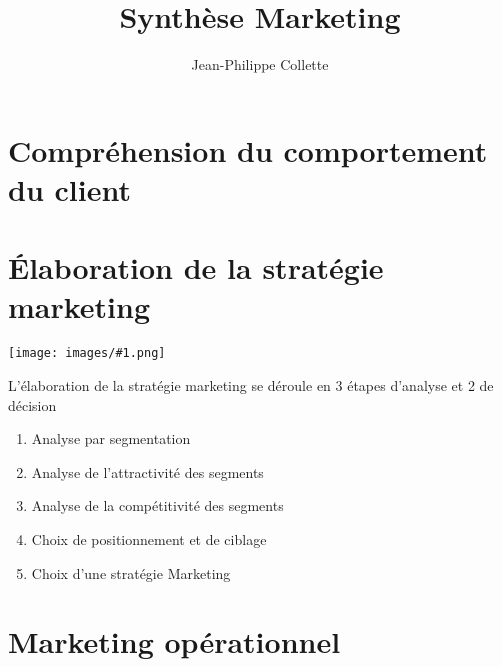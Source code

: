 \documentclass[10pt,a4paper]{report}
\author{Jean-Philippe Collette}
\title{Synthèse Marketing}
\newcommand{\dessin}[1]{\begin{center}\texttt{[image: images/\#1.png]}\end{center}}
\begin{document}
\maketitle
\tableofcontents

\part{Compréhension du comportement du client}



	
\part{Élaboration de la stratégie marketing}

\dessin{58}

L'élaboration de la stratégie marketing se déroule en 3 étapes d'analyse et 2 de décision

\begin{enumerate}
	\item Analyse par segmentation
	\item Analyse de l'attractivité des segments
	\item Analyse de la compétitivité des segments
	\item Choix de positionnement et de ciblage
	\item Choix d'une stratégie Marketing
\end{enumerate}







			
\part{Marketing opérationnel}



\end{document}
